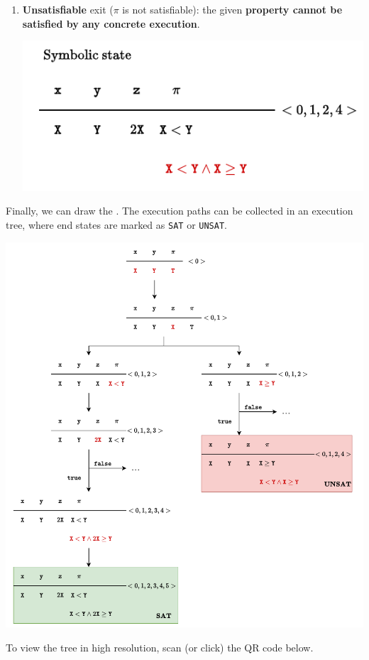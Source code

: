 \begin{examplebox}
\begin{enumerate}
\begin{enumerate}
            \item \textcolor{Red2}{\textbf{Unsatisfiable}} exit ($\pi$ is not satisfiable): the given \textbf{property cannot be satisfied by any concrete execution}.
            \begin{center}
                \includegraphics[width=.6\textwidth]{img/symbolic-state-9.pdf}
            \end{center}
        \end{enumerate}
    \end{enumerate}
    Finally, we can draw the . The execution paths can be collected in an execution tree, where end states are marked as \texttt{SAT} or \texttt{UNSAT}.
    \begin{center}
        \includegraphics[width=\textwidth]{img/symbolic-state-10.pdf}
    \end{center}
    To view the tree in high resolution, scan (or click) the QR code below.
    \begin{center}
    \end{center}
\end{examplebox}